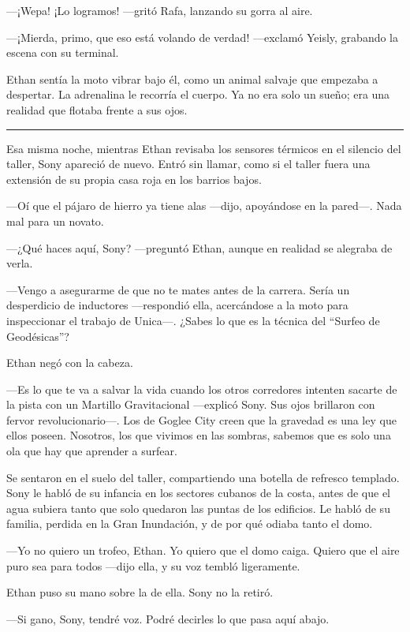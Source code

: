 \documentclass[12pt,a4paper]{book}
\begin{document}
---¡Wepa! ¡Lo logramos! ---gritó Rafa, lanzando su gorra al aire.

---¡Mierda, primo, que eso está volando de verdad! ---exclamó Yeisly, grabando la escena con su terminal.

Ethan sentía la moto vibrar bajo él, como un animal salvaje que empezaba a despertar. La adrenalina le recorría el cuerpo. Ya no era solo un sueño; era una realidad que flotaba frente a sus ojos.

\bigskip
\noindent\rule{\textwidth}{0.4pt}
\bigskip

Esa misma noche, mientras Ethan revisaba los sensores térmicos en el silencio del taller, Sony apareció de nuevo. Entró sin llamar, como si el taller fuera una extensión de su propia casa roja en los barrios bajos.

---Oí que el pájaro de hierro ya tiene alas ---dijo, apoyándose en la pared---. Nada mal para un novato.

---¿Qué haces aquí, Sony? ---preguntó Ethan, aunque en realidad se alegraba de verla.

---Vengo a asegurarme de que no te mates antes de la carrera. Sería un desperdicio de inductores ---respondió ella, acercándose a la moto para inspeccionar el trabajo de Unica---. ¿Sabes lo que es la técnica del ``Surfeo de Geodésicas''?

Ethan negó con la cabeza.

---Es lo que te va a salvar la vida cuando los otros corredores intenten sacarte de la pista con un Martillo Gravitacional ---explicó Sony. Sus ojos brillaron con fervor revolucionario---. Los de Goglee City creen que la gravedad es una ley que ellos poseen. Nosotros, los que vivimos en las sombras, sabemos que es solo una ola que hay que aprender a surfear.

Se sentaron en el suelo del taller, compartiendo una botella de refresco templado. Sony le habló de su infancia en los sectores cubanos de la costa, antes de que el agua subiera tanto que solo quedaron las puntas de los edificios. Le habló de su familia, perdida en la Gran Inundación, y de por qué odiaba tanto el domo.

---Yo no quiero un trofeo, Ethan. Yo quiero que el domo caiga. Quiero que el aire puro sea para todos ---dijo ella, y su voz tembló ligeramente.

Ethan puso su mano sobre la de ella. Sony no la retiró.

---Si gano, Sony, tendré voz. Podré decirles lo que pasa aquí abajo.
\end{document}
